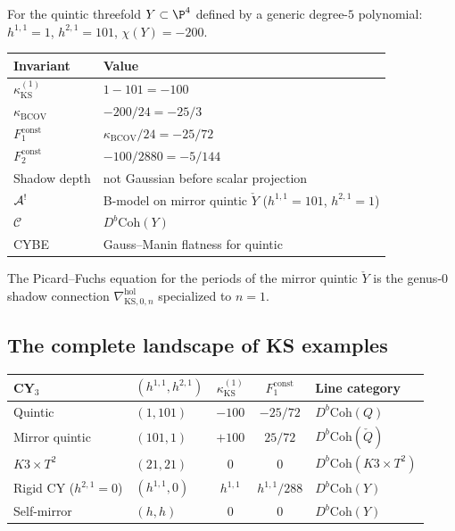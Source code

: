 \begin{computation}
For the quintic threefold $Y \subset \P^4$ defined by a generic
degree-$5$ polynomial: $h^{1,1} = 1$, $h^{2,1} = 101$,
$\chi(Y) = -200$.
\begin{center}
\renewcommand{\arraystretch}{1.2}
\small
\begin{tabular}{ll}
\textbf{Invariant} & \textbf{Value} \\
\hline
$\kappa_{\mathrm{KS}}^{(1)}$ & $1 - 101 = -100$ \\
$\kappa_{\mathrm{BCOV}}$ & $-200/24=-25/3$ \\
$F_1^{\mathrm{const}}$ & $\kappa_{\mathrm{BCOV}}/24=-25/72$ \\
$F_2^{\mathrm{const}}$ & $-100/2880=-5/144$ \\
Shadow depth & not Gaussian before scalar projection \\
$\mathcal{A}^!$ & B-model on mirror quintic $\check{Y}$
 ($h^{1,1} = 101$, $h^{2,1} = 1$) \\
$\mathcal{C}$ & $D^b\mathrm{Coh}(Y)$ \\
CYBE & Gauss--Manin flatness for quintic
\end{tabular}
\end{center}
The Picard--Fuchs equation for the periods of the mirror quintic
$\check{Y}$ is the genus-$0$ shadow connection
$\nabla^{\mathrm{hol}}_{\mathrm{KS},0,n}$ specialized to $n = 1$.
\end{computation}


\subsection{The complete landscape of KS examples}

\begin{center}
\renewcommand{\arraystretch}{1.25}
\small
\begin{tabular}{llccl}
\textbf{CY$_3$} & $(h^{1,1}, h^{2,1})$
 & $\kappa_{\mathrm{KS}}^{(1)}$ & $F_1^{\mathrm{const}}$ & \textbf{Line category} \\
\hline
Quintic & $(1, 101)$ & $-100$ & $-25/72$ & $D^b\mathrm{Coh}(Q)$ \\
Mirror quintic & $(101, 1)$ & $+100$ & $25/72$ & $D^b\mathrm{Coh}(\check{Q})$ \\
$K3 \times T^2$ & $(21, 21)$ & $0$ & $0$ & $D^b\mathrm{Coh}(K3 \times T^2)$ \\
Rigid CY ($h^{2,1} = 0$) & $(h^{1,1}, 0)$ & $h^{1,1}$ & $h^{1,1}/288$ & $D^b\mathrm{Coh}(Y)$ \\
Self-mirror & $(h, h)$ & $0$ & $0$ & $D^b\mathrm{Coh}(Y)$
\end{tabular}
\end{center}

